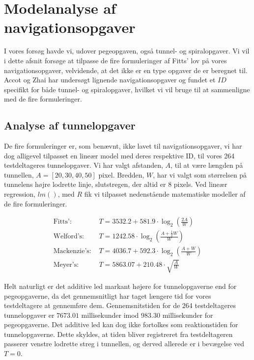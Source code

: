 \section*{Modelanalyse af navigationsopgaver}
I vores forsøg havde vi, udover pegeopgaven, også tunnel- og spiralopgaver. Vi vil i dette afsnit forsøge at tilpasse de fire formuleringer af Fitts' lov på vores navigationsopgaver, velvidende, at det ikke er en type opgaver de er beregnet til. Accot og Zhai har undersøgt lignende navigationsopgaver og fundet et $ID$ specifikt for både tunnel- og spiralopgaver, hvilket vi vil bruge til at sammenligne med de fire formuleringer\cite{accot1997}.

\subsection*{Analyse af tunnelopgaver}
De fire formuleringer er, som benævnt, ikke lavet til navigationsopgaver, vi har dog alligevel tilpasset en lineær model med deres respektive ID, til vores 264 testdeltageres tunnelopgaver. Vi har valgt afstanden, $A$, til at være længden på tunnellen, $A=[20,30,40,50]$ pixel. Bredden, $W$, har vi valgt som størrelsen på tunnelens højre lodrette linje, slutstregen, der altid er $8$ pixels. Ved lineær regression, $lm()$, med $R$ fik vi tilpasset nedenstående matematiske modeller af de fire formuleringer.

\begin{align*}
\text{Fitts': } &T = 3532.2 + 581.9\cdot \log_2\left(\frac{2A}{W}\right)\\
\text{Welford's: } &T =  1242.58\cdot \log_2\left(\frac{A+\frac{1}{2}W}{W}\right)\\
\text{Mackenzie's: } &T = 4036.7 + 592.3\cdot \log_2\left(\frac{A+W}{W}\right)\\
\text{Meyer's: } &T = 5863.07 + 210.48 \cdot \sqrt{\frac{A}{W}}
\end{align*}

Helt naturligt er det additive led markant højere for tunnelopgaverne end for pegeopgaverne, da det gennemsnitligt har taget længere tid for vores testdeltagere at gennemføre dem. Gennemsnitstiden for de 264 testdeltageres tunnelopgaver er $7673.01$ millisekunder imod $983.30$ millisekunder for pegeopgaverne. Det additive led kan dog ikke fortolkes som reaktionstiden for tunnelopgaverne. Dette skyldes, at tiden bliver registreret fra testdeltageren passerer venstre lodrette streg i tunnellen, og derved allerede er i bevægelse ved $T=0$.


